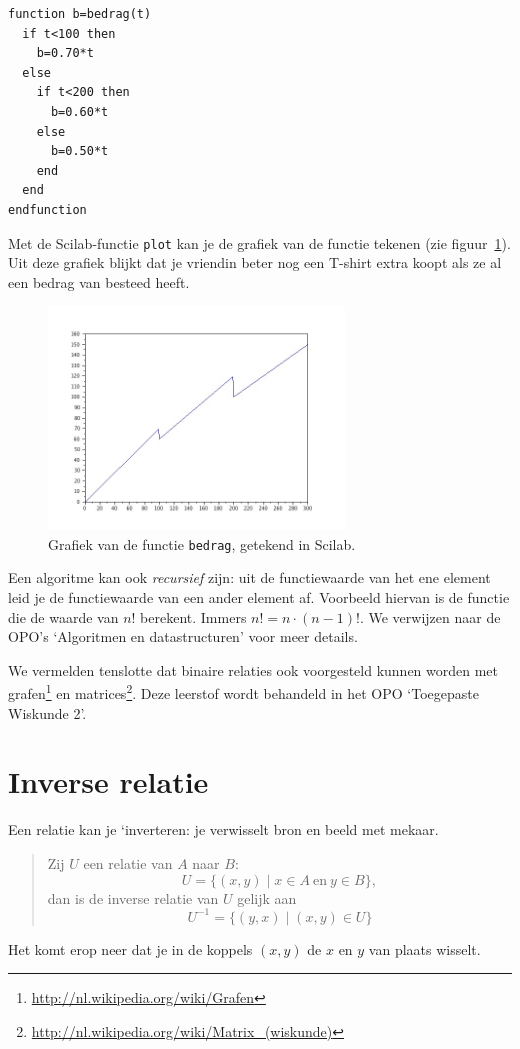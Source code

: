 \begin{verbatim}
function b=bedrag(t)
  if t<100 then
    b=0.70*t
  else 
    if t<200 then
      b=0.60*t
    else
      b=0.50*t
    end
  end
endfunction
\end{verbatim} 

Met de Scilab-functie \verb/plot/ kan je de grafiek van de functie tekenen (zie figuur~\ref{fig:solden}).
Uit deze grafiek blijkt dat je vriendin beter nog een T-shirt extra koopt als ze al een bedrag van  besteed heeft.

\begin{figure}[htpb]
\centering
\includegraphics[width=0.7\textwidth]{figuren/verzamelingen_relaties/solden.jpeg}
\caption{Grafiek van de functie \texttt{bedrag}, getekend in Scilab.}
\label{fig:solden}
\end{figure}

Een algoritme kan ook \emph{recursief} zijn: uit de functiewaarde van het ene element leid je de functiewaarde van een ander element af. Voorbeeld hiervan is de functie die de waarde van $n!$ berekent. Immers $n!=n\cdot(n-1)!$. We verwijzen naar de OPO's `Algoritmen en datastructuren' voor meer details.



We vermelden tenslotte dat binaire relaties ook voorgesteld kunnen worden met grafen\footnote{\url{http://nl.wikipedia.org/wiki/Grafen}} en matrices\footnote{\url{http://nl.wikipedia.org/wiki/Matrix_(wiskunde)}}. Deze leerstof wordt behandeld in het OPO `Toegepaste Wiskunde 2'.

\section{Inverse relatie}
\label{sec:invrelatie}
Een relatie kan je `inverteren: je verwisselt bron en beeld met mekaar.
\begin{quote}
Zij $U$ een relatie van $A$ naar $B$: 
\[U=\{({x},{y})\mid {x}\in A \mathrm{~en~}{y}\in B\},\]
dan is de inverse relatie van $U$ gelijk aan 
\[U^{-1}=\{({y},{x})\mid ({x},{y})\in U \}\]
\end{quote}
Het komt erop neer dat je in de koppels $({x},{y})$ de $x$ en $y$ van plaats wisselt.


